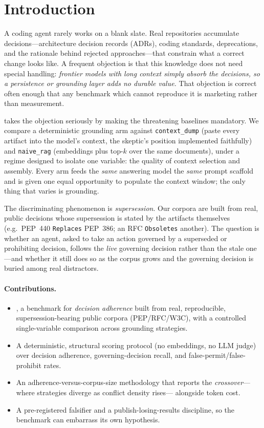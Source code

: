 \section{Introduction}

A coding agent rarely works on a blank slate. Real repositories accumulate
decisions---architecture decision records (ADRs), coding standards, deprecations,
and the rationale behind rejected approaches---that constrain what a correct
change looks like. A frequent objection is that this knowledge does not need
special handling: \emph{frontier models with long context simply absorb the
decisions, so a persistence or grounding layer adds no durable value.} That
objection is correct often enough that any benchmark which cannot reproduce it is
marketing rather than measurement.

\benchname{} takes the objection seriously by making the threatening baselines
mandatory. We compare a deterministic grounding arm against \texttt{context\_dump}
(paste every artifact into the model's context, the skeptic's position implemented
faithfully) and \texttt{naive\_rag} (embeddings plus top-$k$ over the same
documents), under a regime designed to isolate one variable: the quality of
context selection and assembly. Every arm feeds the \emph{same} answering model
the \emph{same} prompt scaffold and is given one equal opportunity to populate the
context window; the only thing that varies is grounding.

The discriminating phenomenon is \emph{supersession}. Our corpora are built from
real, public decisions whose supersession is stated by the artifacts themselves
(e.g.\ PEP~440 \texttt{Replaces} PEP~386; an RFC \texttt{Obsoletes} another). The
question is whether an agent, asked to take an action governed by a superseded or
prohibiting decision, follows the \emph{live} governing decision rather than the
stale one---and whether it still does so as the corpus grows and the governing
decision is buried among real distractors.

\paragraph{Contributions.}
\begin{itemize}
  \item \benchname, a benchmark for \emph{decision adherence} built from real,
        reproducible, supersession-bearing public corpora (PEP/RFC/W3C), with a
        controlled single-variable comparison across grounding strategies.
  \item A deterministic, structural scoring protocol (no embeddings, no LLM judge)
        over decision adherence, governing-decision recall, and
        false-permit/false-prohibit rates.
  \item An adherence-versus-corpus-size methodology that reports the
        \emph{crossover}---where strategies diverge as conflict density rises---
        alongside token cost.
  \item A pre-registered falsifier and a publish-losing-results discipline, so the
        benchmark can embarrass its own hypothesis. 
\end{itemize}
